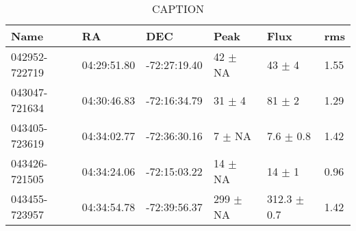 \begin{table}[ht]
\centering
\begin{tabular}{llllll}
  \hline
Name & RA & DEC & Peak & Flux & rms \\ 
  \hline
042952-722719 & 04:29:51.80 & -72:27:19.40 & 42 $\pm$ NA & 43 $\pm$ 4 & 1.55 \\ 
  043047-721634 & 04:30:46.83 & -72:16:34.79 & 31 $\pm$ 4 & 81 $\pm$ 2 & 1.29 \\ 
  043405-723619 & 04:34:02.77 & -72:36:30.16 & 7 $\pm$ NA & 7.6 $\pm$ 0.8 & 1.42 \\ 
  043426-721505 & 04:34:24.06 & -72:15:03.22 & 14 $\pm$ NA & 14 $\pm$ 1 & 0.96 \\ 
  043455-723957 & 04:34:54.78 & -72:39:56.37 & 299 $\pm$ NA & 312.3 $\pm$ 0.7 & 1.42 \\ 
   \hline
\end{tabular}
\caption{CAPTION} 
\label{fig:mosttable}
\end{table}

